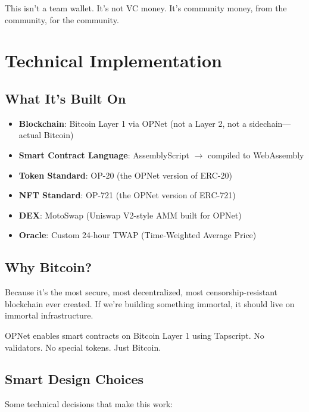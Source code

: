 \documentclass[11pt,a4paper]{article}
\begin{document}
This isn't a team wallet. It's not VC money. It's community money, from the community, for the community.

\section{Technical Implementation}

\subsection{What It's Built On}

\begin{itemize}
    \item \textbf{Blockchain}: Bitcoin Layer 1 via OPNet (not a Layer 2, not a sidechain---actual Bitcoin)
    \item \textbf{Smart Contract Language}: AssemblyScript $\rightarrow$ compiled to WebAssembly
    \item \textbf{Token Standard}: OP-20 (the OPNet version of ERC-20)
    \item \textbf{NFT Standard}: OP-721 (the OPNet version of ERC-721)
    \item \textbf{DEX}: MotoSwap (Uniswap V2-style AMM built for OPNet)
    \item \textbf{Oracle}: Custom 24-hour TWAP (Time-Weighted Average Price)
\end{itemize}

\subsection{Why Bitcoin?}

Because it's the most secure, most decentralized, most censorship-resistant blockchain ever created. If we're building something immortal, it should live on immortal infrastructure.

OPNet enables smart contracts on Bitcoin Layer 1 using Tapscript. No validators. No special tokens. Just Bitcoin.

\subsection{Smart Design Choices}

Some technical decisions that make this work:
\end{document}
